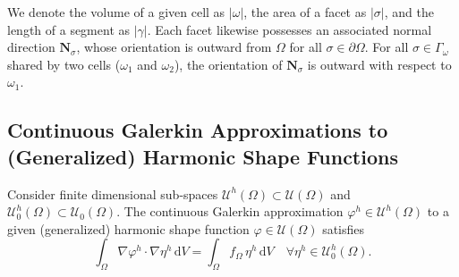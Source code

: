 	We denote the volume of a given cell as $|\omega|$, the area of a facet as $|\sigma|$, and the length of a segment as $|\gamma|$. Each facet likewise possesses an associated normal direction $\bm{N}_\sigma$, whose orientation is outward from $\Omega$ for all $\sigma \in \partial \Omega$. For all $\sigma \in \Gamma_\omega$ shared by two cells ($\omega_1$ and $\omega_2$), the orientation of $\bm{N}_\sigma$ is outward with respect to $\omega_1$.
	
\subsection*{Continuous Galerkin Approximations to (Generalized) Harmonic Shape Functions}

	Consider finite dimensional sub-spaces $\mathcal{U}^h (\Omega) \subset \mathcal{U} (\Omega)$ and $\mathcal{U}^h_0 (\Omega) \subset \mathcal{U}_0 (\Omega)$. The continuous Galerkin approximation $\varphi^h \in \mathcal{U}^h (\Omega)$ to a given (generalized) harmonic shape function $\varphi \in \mathcal{U} (\Omega)$ satisfies
	\begin{equation}
		\int_\Omega \nabla \varphi^h \cdot \nabla \eta^h \, \mathrm dV = \int_\Omega f_{\Omega} \, \eta^h \, \mathrm dV \quad \forall \eta^h \in \mathcal{U}^h_0 (\Omega).
		\label{eq:weak_poisson}
	\end{equation}

